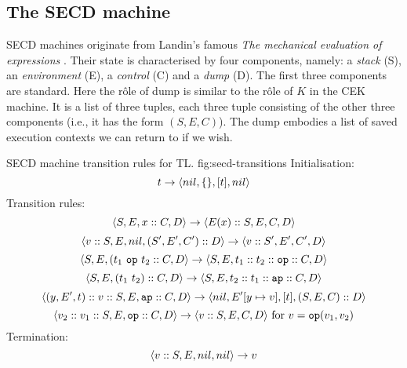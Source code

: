 \documentclass[class=article, crop=false]{standalone}
\begin{document}
\subsection{The SECD machine}

SECD machines originate from Landin's famous
\emph{The mechanical evaluation of expressions} \cite{landin-secd}. Their state
is characterised by four components, namely: a \emph{stack} (S),
an \emph{environment} (E), a \emph{control} (C) and a \emph{dump} (D). The first
three components are standard. Here the rôle of dump is similar to the rôle of
$K$ in the CEK machine. It is a list of three tuples, each three tuple consisting
of the other three components (i.e., it has the form $(S, E, C)$). The dump
embodies a list of saved execution contexts we can return to if we wish.

\begin{myfigure}[.8]
{SECD machine transition rules for TL.}
{fig:secd-transitions}
Initialisation:
$$ t \to \langle nil, \{\}, [t], nil \rangle $$
%
Transition rules:
$$ \langle S, E, x :: C, D \rangle \to \langle E(x) :: S, E, C, D \rangle $$
$$ \langle v :: S, E, nil, (S', E', C') :: D \rangle \to \langle v :: S', E', C', D \rangle $$
$$ \langle S, E, (t_1\ \mathtt{op}\ t_2 :: C, D \rangle \to \langle S, E, t_1 :: t_2 :: \mathtt{op} :: C, D \rangle $$
$$ \langle S, E, (t_1\ t_2) :: C, D \rangle \to \langle S, E, t_2 :: t_1 :: \mathtt{ap} :: C, D \rangle $$
$$ \langle (y, E', t) :: v :: S, E, \mathtt{ap} :: C, D \rangle \to \langle nil, E'[y \mapsto v], [t], (S, E, C) :: D \rangle $$
$$ \langle v_2 :: v_1 :: S, E, \mathtt{op} :: C, D \rangle \to \langle v :: S, E, C, D \rangle \text{ for } v = \mathtt{op}(v_1, v_2) $$
%
Termination:
$$ \langle v :: S, E, nil, nil \rangle \to v $$
\end{myfigure}
\end{document}
